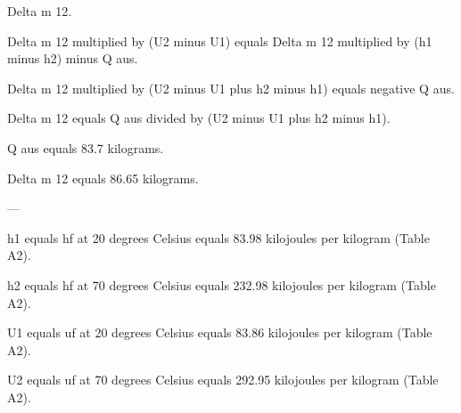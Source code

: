 Delta m 12.  

Delta m 12 multiplied by (U2 minus U1) equals Delta m 12 multiplied by (h1 minus h2) minus Q aus.  

Delta m 12 multiplied by (U2 minus U1 plus h2 minus h1) equals negative Q aus.  

Delta m 12 equals Q aus divided by (U2 minus U1 plus h2 minus h1).  

Q aus equals 83.7 kilograms.  

Delta m 12 equals 86.65 kilograms.  

---

h1 equals hf at 20 degrees Celsius equals 83.98 kilojoules per kilogram (Table A2).  

h2 equals hf at 70 degrees Celsius equals 232.98 kilojoules per kilogram (Table A2).  

U1 equals uf at 20 degrees Celsius equals 83.86 kilojoules per kilogram (Table A2).  

U2 equals uf at 70 degrees Celsius equals 292.95 kilojoules per kilogram (Table A2).